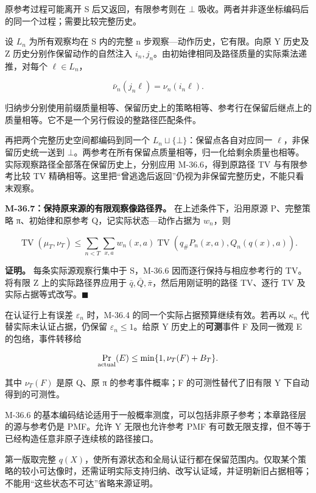 \documentclass[
  11pt,
  oneside]{book}
\begin{document}
原参考过程可能离开 S 后又返回，有限参考则在 \(\bot\) 吸收。两者并非逐坐标编码后的同一个过程；需要比较完整历史。

设 \(L_n\) 为所有观察均在 S 内的完整 n 步观察---动作历史，它有限。向原 Y 历史及 Z 历史分别作保留动作的自然注入 \(i_n,j_n\)。由初始律相同及路径质量的实际乘法递推，对每个 \(\ell\in L_n\)，

\[\bar\nu_n(j_n\ell)=\nu_n(i_n\ell).\]

归纳步分别使用前缀质量相等、保留历史上的策略相等、参考行在保留后继点上的质量相等。它不是一个另行假设的整路径匹配条件。

再把两个完整历史空间都编码到同一个 \(L_n\sqcup\{\bot\}\)：保留点各自对应同一 \(\ell\)，非保留历史统一送到 \(\bot\)。两参考在所有保留点质量相等，归一化给剩余质量也相等。实际观察路径全部落在保留历史上，分别应用 M-36.6，得到原路径 TV 与有限参考比较 TV 精确相等。这里把``曾逃逸后返回''仍视为非保留完整历史，不能只看末观察。

\hypertarget{m-36-7}{}\label{m-36-7}

\textbf{M-36.7：保持原来源的有限观察像路径界。} 在上述条件下，沿用原源 P、完整策略 π、初始律和原参考 Q，记实际状态---动作占据为 \(w_n\)，则

\[\operatorname{TV}(\mu_T,\nu_T)
\le \sum_{n<T}\sum_{x,a}w_n(x,a)
\operatorname{TV}(q_\#P_n(x,a),Q_n(q(x),a)).\]

\textbf{证明。} 每条实际源观察行集中于 S，M-36.6 因而逐行保持与相应参考行的 TV。将有限 Z 上的实际路径界应用于 \(\bar q,\bar Q,\bar\pi\)，然后用刚证明的路径 TV、逐行 TV 及实际占据等式改写。\(\blacksquare\)

在认证行上有误差 \(\varepsilon_n\) 时，M-36.4 的同一个实际占据预算继续有效。若再以 \(\kappa_n\) 代替实际未认证占据，仍保留 \(\varepsilon_n\le1\)。给原 Y 历史上的\textbf{可测}事件 F 及同一微观 E 的包络，事件转移给

\[\Pr_{\rm actual}(E)\le
\min\{1,\nu_T(F)+B_T\}.\]

其中 \(\nu_T(F)\) 是原 Q、原 π 的参考事件概率；F 的可测性替代了旧有限 Y 下自动得到的可测性。

M-36.6 的基本编码结论适用于一般概率测度，可以包括非原子参考；本章路径层的源与参考仍是 PMF。允许 Y 无限也允许参考 PMF 有可数无限支撑，但不等于已经构造任意非原子连续核的路径接口。

第一版取完整 \(q(X)\)，使所有源状态和全局认证行都在保留范围内。仅取某个策略的较小可达像时，还需证明实际支持归纳、改写认证域，并证明新旧占据相等；不能用``这些状态不可达''省略来源证明。
\end{document}
